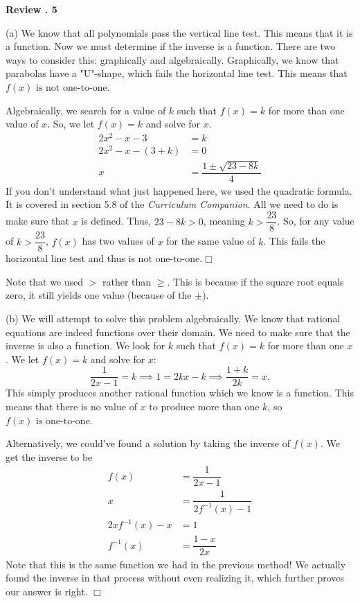 \documentclass[lang=en,11pt]{elegantbook}
\begin{document}
\noindent \textbf{Review . 5}

(a) We know that all polynomials pass the vertical line test. This means that it is a function.  Now we must determine if the inverse is a function.  There are two ways to consider this: graphically and algebraically.  Graphically, we know that parabolas have a "U"-shape, which fails the horizontal line test.  This means that $\boxed{f(x) \text{ is not one-to-one}}$.

Algebraically, we search for a value of $k$ such that $f(x)=k$ for more than one value of $x$.  So, we let $f(x)=k$ and solve for $x$. \begin{align*}
    2x^2-x-3&=k \\ 2x^2-x-(3+k)&=0 \\ x&=\dfrac{1\pm\sqrt{23-8k}}{4}
\end{align*}
If you don't understand what just happened here, we used the quadratic formula.  It is covered in section 5.8 of the \textit{Curriculum Companion}.  All we need to do is make sure that $x$ is defined.  Thus, $23-8k>0$, meaning $k>\dfrac{23}{8}$.  So, for any value of $k>\dfrac{23}{8}$, $f(x)$ has two values of $x$ for the same value of $k$.  This fails the horizontal line test and thus is $\boxed{\text{not one-to-one}}$.$\Box$

\begin{remark}
Note that we used $>$ rather than $\geq$.  This is because if the square root equals zero, it still yields one value (because of the $\pm$).
\end{remark}

(b) We will attempt to solve this problem algebraically.  We know that rational equations are indeed functions over their domain.  We need to make sure that the inverse is also a function.  We look for $k$ such that $f(x)=k$ for more than one $x$.  We let $f(x)=k$ and solve for $x$: $$\dfrac{1}{2x-1} = k \implies 1=2kx-k \implies \dfrac{1+k}{2k}=x.$$
This simply produces another rational function which we know is a function.  This means that there is no value of $x$ to produce more than one $k$, so $\boxed{f(x)\text{ is one-to-one}}$.

Alternatively, we could've found a solution by taking the inverse of $f(x)$.  We get the inverse to be \begin{align*}
    f(x)&=\dfrac{1}{2x-1} \\ x&=\dfrac{1}{2f^{-1}(x)-1} \\ 2xf^{-1}(x)-x&=1 \\ f^{-1}(x)&=\dfrac{1-x}{2x}
\end{align*}
Note that this is the same function we had in the previous method!  We actually found the inverse in that process without even realizing it, which further proves our answer is right. $\Box$
\end{document}
